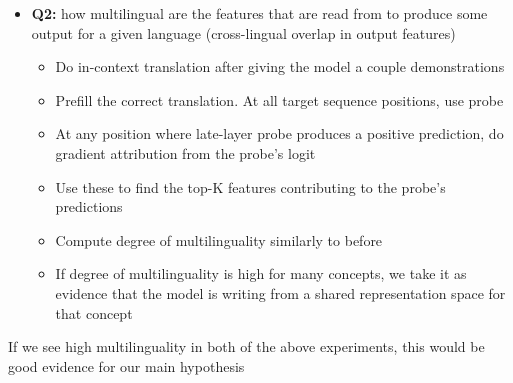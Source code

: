 \documentclass[11pt]{article}
\begin{document}
\begin{itemize}
    \item \textbf{Q2:} how multilingual are the features that are read from to produce some output for a given language (cross-lingual overlap in output features)
    \begin{itemize}
        \item Do in-context translation after giving the model a couple demonstrations
        \item Prefill the correct translation. At all target sequence positions, use probe
        \item At any position where late-layer probe produces a positive prediction, do gradient attribution from the probe's logit
        \item Use these to find the top-K features contributing to the probe's predictions
        \item Compute degree of multilinguality similarly to before
        \item If degree of multilinguality is high for many concepts, we take it as evidence that the model is writing from a shared representation space for that concept
    \end{itemize}
\end{itemize}

If we see high multilinguality in both of the above experiments, this would be good evidence for our main hypothesis
\end{document}
